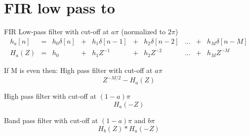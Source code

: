 \documentclass[envcountsect,dvips]{beamer}
\begin{document}
\section{FIR low pass to }

\begin{block}{FIR Low-pass filter with cut-off at $a\pi$ (normalized to $2\pi$)}
\tiny
 \begin{equation}
 \begin{matrix}
h_a[n] & = & h_0 \delta[n] &+& h_1\delta[n-1] &+& h_2\delta[n-2] &... &+& h_M \delta[n-M]\\
H_a(Z) & = & h_0           &+& h_1Z^{-1}      &+& h_2 Z^{-2}     &... &+& h_M Z^{-M}    
 \end{matrix}
 \end{equation}
\normalsize
\end{block}
\begin{block}{If M is even then: High pass filter with cut-off at $a\pi$}
 \begin{equation}
  Z^{-M/2}-H_a(Z)
 \end{equation}
\end{block}
\begin{block}{High pass filter with cut-off at $(1-a)\pi$}
 \begin{equation}
 H_a(-Z)
 \end{equation}
\end{block}
\begin{block}{Band pass filter with cut-off at $(1-a)\pi$ and $b\pi$}
 \begin{equation}
 H_b(Z)*H_a(-Z)
 \end{equation}
\end{block}
\end{document}
